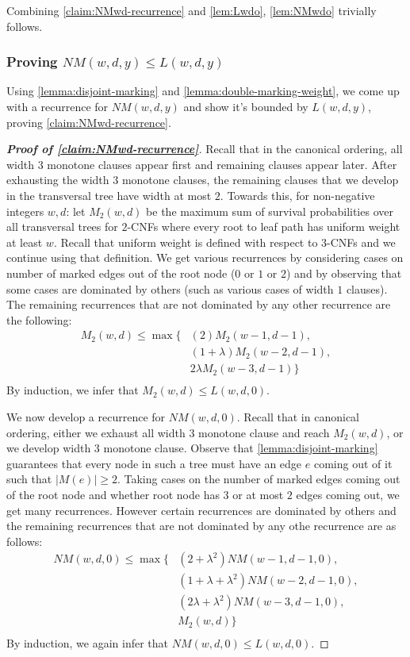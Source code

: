 \documentclass[10pt,a4paper]{article}
\newcommand{\openinteger}{y}
\begin{document}
Combining \cref{claim:NMwd-recurrence} and \cref{lem:Lwdo}, \cref{lem:NMwdo} trivially follows.


\subsubsection{Proving $NM(w, d, \openinteger)\le L(w, d, \openinteger)$}


Using \cref{lemma:disjoint-marking} and \cref{lemma:double-marking-weight}, we come up with a recurrence for $NM(w, d, \openinteger)$ and show it's bounded by $L(w, d, \openinteger)$, proving \cref{claim:NMwd-recurrence}.

\begin{proof}[\textbf{Proof of \cref{claim:NMwd-recurrence}}]
Recall that in the canonical ordering, all width $3$ monotone clauses appear first and remaining clauses appear later. After exhausting the width $3$ monotone clauses, the remaining clauses that we develop in the transversal tree have width at most $2$. Towards this, for non-negative integers $w, d$: let $M_2(w, d)$ be the maximum sum of survival probabilities over all transversal trees for $2$-CNFs where every root to leaf path has uniform weight at least $w$. Recall that uniform weight is defined with respect to $3$-CNFs and we continue using that definition.
We get various recurrences by considering cases on number of marked edges out of the root node ($0$ or $1$ or $2$) and by observing that some cases are dominated by others (such as various cases of width $1$ clauses).
The remaining recurrences that are not dominated by any other recurrence are the following:
\begin{align*}
M_2(w, d) \le 
\max\{
& (2)M_2(w-1, d-1),\\
& (1+\lambda)M_2(w-2, d-1),\\
& 2\lambda M_2(w-3, d-1)
\}\\
\end{align*}
By induction, we infer that $M_2(w, d) \le L(w, d, 0)$.

We now develop a recurrence for $NM(w, d, 0)$.
Recall that in canonical ordering, either we exhaust all width $3$ monotone clause and reach $M_2(w, d)$, or we develop width $3$ monotone clause.
Observe that \cref{lemma:disjoint-marking} guarantees that every node in such a tree must have an edge $e$ coming out of it such that $|M(e)| \ge 2$. Taking cases on the number of marked edges coming out of the root node and whether root node has $3$ or at most $2$ edges coming out, we get many recurrences.
However certain recurrences are dominated by others and the remaining recurrences that are not dominated by any othe recurrence are as follows:
\begin{align*}
NM(w, d, 0) \le 
\max\{
& (2 + \lambda^2)NM(w-1, d-1, 0),\\
& (1+\lambda+\lambda^2)NM(w-2, d-1, 0),\\
& (2\lambda+\lambda^2) NM(w-3, d-1, 0),\\
& M_2(w, d)
\}\\
\end{align*}
By induction, we again infer that $NM(w, d, 0) \le L(w, d, 0)$.


\end{proof}
\end{document}
